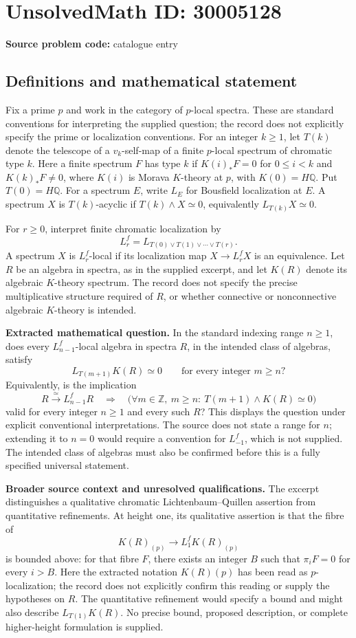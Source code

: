 \documentclass[11pt]{article}
\newcommand{\Z}{\mathbb{Z}}
\newcommand{\Q}{\mathbb{Q}}
\begin{document}
\section*{UnsolvedMath ID: 30005128}
\textbf{Source problem code:} catalogue entry
\subsection{Definitions and mathematical statement}
Fix a prime \(p\) and work in the category of \(p\)-local spectra. These are standard conventions for interpreting the supplied question; the record does not explicitly specify the prime or localization conventions. For an integer \(k\geq 1\), let \(T(k)\) denote the telescope of a \(v_k\)-self-map of a finite \(p\)-local spectrum of chromatic type \(k\). Here a finite spectrum \(F\) has type \(k\) if \(K(i)_*F=0\) for \(0\leq i<k\) and \(K(k)_*F\neq 0\), where \(K(i)\) is Morava \(K\)-theory at \(p\), with \(K(0)=H\Q\). Put \(T(0)=H\Q\). For a spectrum \(E\), write \(L_E\) for Bousfield localization at \(E\). A spectrum \(X\) is \(T(k)\)-acyclic if \(T(k)\wedge X\simeq 0\), equivalently \(L_{T(k)}X\simeq 0\).

For \(r\geq 0\), interpret finite chromatic localization by
\[
L^f_r=L_{T(0)\vee T(1)\vee\cdots\vee T(r)}.
\]
A spectrum \(X\) is \(L^f_r\)-local if its localization map \(X\longrightarrow L^f_rX\) is an equivalence. Let \(R\) be an algebra in spectra, as in the supplied excerpt, and let \(K(R)\) denote its algebraic \(K\)-theory spectrum. The record does not specify the precise multiplicative structure required of \(R\), or whether connective or nonconnective algebraic \(K\)-theory is intended.

\textbf{Extracted mathematical question.} In the standard indexing range \(n\geq 1\), does every \(L^f_{n-1}\)-local algebra in spectra \(R\), in the intended class of algebras, satisfy
\[
L_{T(m+1)}K(R)\simeq 0
\qquad\text{for every integer }m\geq n?
\]
Equivalently, is the implication
\[
R\xrightarrow{\simeq}L^f_{n-1}R
\quad\Longrightarrow\quad
\bigl(\forall m\in\Z,\ m\geq n:\ T(m+1)\wedge K(R)\simeq 0\bigr)
\]
valid for every integer \(n\geq 1\) and every such \(R\)? This displays the question under explicit conventional interpretations. The source does not state a range for \(n\); extending it to \(n=0\) would require a convention for \(L^f_{-1}\), which is not supplied. The intended class of algebras must also be confirmed before this is a fully specified universal statement.

\textbf{Broader source context and unresolved qualifications.} The excerpt distinguishes a qualitative chromatic Lichtenbaum--Quillen assertion from quantitative refinements. At height one, its qualitative assertion is that the fibre of
\[
K(R)_{(p)}\longrightarrow L^f_1K(R)_{(p)}
\]
is bounded above: for that fibre \(F\), there exists an integer \(B\) such that \(\pi_iF=0\) for every \(i>B\). Here the extracted notation \(K(R)(p)\) has been read as \(p\)-localization; the record does not explicitly confirm this reading or supply the hypotheses on \(R\). The quantitative refinement would specify a bound and might also describe \(L_{T(1)}K(R)\). No precise bound, proposed description, or complete higher-height formulation is supplied.
\end{document}
